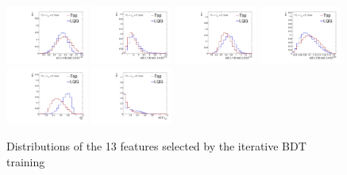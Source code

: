 \begin{figure}[]
\begin{center}
        \includegraphics[width=0.24\textwidth]{figures/toptagging/shapes/mass_ratio_13402320.pdf}
        \includegraphics[width=0.24\textwidth]{figures/toptagging/shapes/mass_ratio_33101340.pdf}
        \includegraphics[width=0.24\textwidth]{figures/toptagging/shapes/mass_ratio_33102320.pdf}
        \includegraphics[width=0.24\textwidth]{figures/toptagging/shapes/mass_ratio_33203340.pdf} \\ 
        \includegraphics[width=0.24\textwidth]{figures/toptagging/shapes/mass_fjTau32SD.pdf}
        \includegraphics[width=0.24\textwidth]{figures/toptagging/shapes/mass_fjHTTFRec.pdf}
        \caption{Distributions of the 13 features selected by the iterative BDT training}
        \label{fig:jets:features}
    \end{center}
\end{figure}

